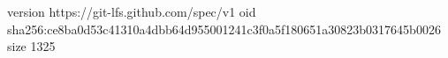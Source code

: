 version https://git-lfs.github.com/spec/v1
oid sha256:ce8ba0d53c41310a4dbb64d955001241c3f0a5f180651a30823b0317645b0026
size 1325
